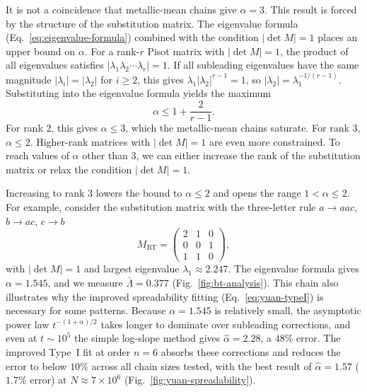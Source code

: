 \documentclass[11pt]{article}
\begin{document}
It is not a coincidence that metallic-mean chains give $\alpha = 3$. This result is forced by the structure of the substitution matrix. The eigenvalue formula (Eq.~\ref{eq:eigenvalue-formula}) combined with the condition $|\det M| = 1$ places an upper bound on $\alpha$. For a rank-$r$ Pisot matrix with $|\det M| = 1$, the product of all eigenvalues satisfies $|\lambda_1 \lambda_2 \cdots \lambda_r| = 1$. If all subleading eigenvalues have the same magnitude $|\lambda_i| = |\lambda_2|$ for $i \geq 2$, this gives $\lambda_1 |\lambda_2|^{r-1} = 1$, so $|\lambda_2| = \lambda_1^{-1/(r-1)}$. Substituting into the eigenvalue formula yields the maximum
\begin{equation}
\alpha \leq 1 + \frac{2}{r-1}.
\label{eq:alpha-bound}
\end{equation}
For rank 2, this gives $\alpha \leq 3$, which the metallic-mean chains saturate. For rank 3, $\alpha \leq 2$. Higher-rank matrices with $|\det M| = 1$ are even more constrained. To reach values of $\alpha$ other than 3, we can either increase the rank of the substitution matrix or relax the condition $|\det M| = 1$.

Increasing to rank 3 lowers the bound to $\alpha \leq 2$ and opens the range $1 < \alpha \leq 2$. For example, consider the substitution matrix with the three-letter rule $a \to aac$, $b \to ac$, $c \to b$~\cite{bombieri1986which}
\begin{equation*}
M_\text{BT} = \begin{pmatrix} 2 & 1 & 0 \\ 0 & 0 & 1 \\ 1 & 1 & 0 \end{pmatrix},
\end{equation*}
with $|\det M| = 1$ and largest eigenvalue $\lambda_1 \approx 2.247$. The eigenvalue formula gives $\alpha = 1.545$, and we measure $\bar\Lambda = 0.377$ (Fig.~\ref{fig:bt-analysis}). This chain also illustrates why the improved spreadability fitting (Eq.~\ref{eq:yuan-typeI}) is necessary for some patterns. Because $\alpha = 1.545$ is relatively small, the asymptotic power law $t^{-(1+\alpha)/2}$ takes longer to dominate over subleading corrections, and even at $t \sim 10^5$ the simple log-slope method gives $\hat\alpha = 2.28$, a $48\%$ error. The improved Type~I fit at order $n = 6$ absorbs these corrections and reduces the error to below $10\%$ across all chain sizes tested, with the best result of $\hat\alpha = 1.57$ ($1.7\%$ error) at $N \approx 7 \times 10^6$ (Fig.~\ref{fig:yuan-spreadability}).
\end{document}
